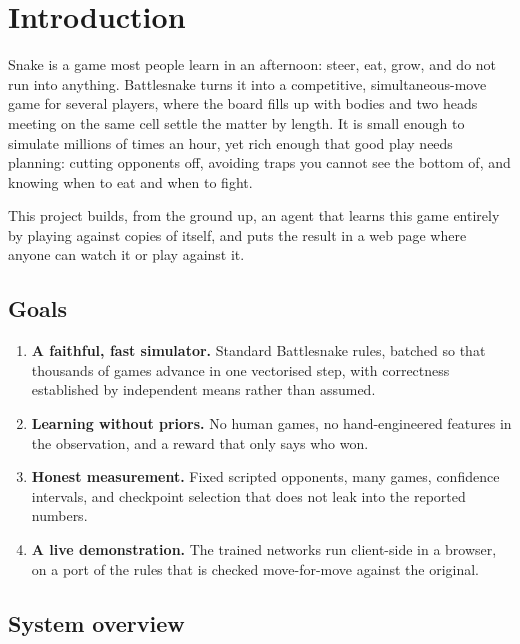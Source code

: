 \chapter{Introduction}\label{ch:intro}

Snake is a game most people learn in an afternoon: steer, eat, grow, and do not run into
anything. Battlesnake turns it into a competitive, simultaneous-move game for several
players, where the board fills up with bodies and two heads meeting on the same cell
settle the matter by length. It is small enough to simulate millions of times an hour,
yet rich enough that good play needs planning: cutting opponents off, avoiding traps you
cannot see the bottom of, and knowing when to eat and when to fight.

This project builds, from the ground up, an agent that learns this game entirely by
playing against copies of itself, and puts the result in a web page where anyone can
watch it or play against it.

\section{Goals}

\begin{enumerate}
\item \textbf{A faithful, fast simulator.} Standard Battlesnake rules, batched so that
  thousands of games advance in one vectorised step, with correctness established by
  independent means rather than assumed.
\item \textbf{Learning without priors.} No human games, no hand-engineered features in the
  observation, and a reward that only says who won.
\item \textbf{Honest measurement.} Fixed scripted opponents, many games, confidence
  intervals, and checkpoint selection that does not leak into the reported numbers.
\item \textbf{A live demonstration.} The trained networks run client-side in a browser,
  on a port of the rules that is checked move-for-move against the original.
\end{enumerate}

\section{System overview}

